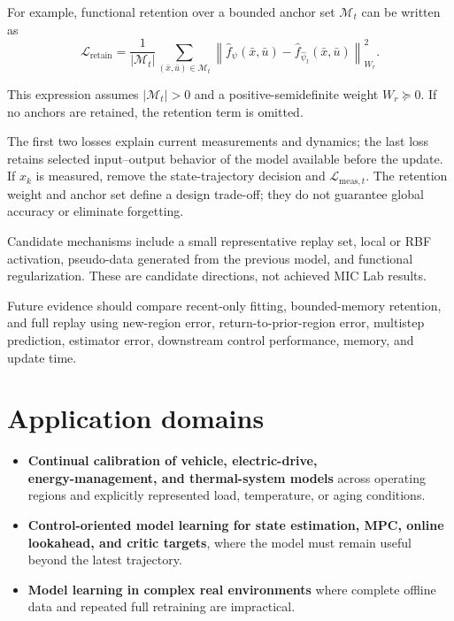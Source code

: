 \documentclass[a4paper]{article}
\begin{document}
For example, functional retention over a bounded anchor set
$\mathcal M_t$ can be written as
\begin{equation}
  \mathcal L_{\mathrm{retain}}
  =
  \frac{1}{|\mathcal M_t|}
  \sum_{(\bar x,\bar u)\in\mathcal M_t}
  \left\|
  \widehat f_{\psi}(\bar x,\bar u)
  -
  \widehat f_{\widehat\psi_t}(\bar x,\bar u)
  \right\|_{W_r}^{2}.
\end{equation}

This expression assumes $|\mathcal M_t|>0$ and a positive-semidefinite weight
$W_r\succeq0$. If no anchors are retained, the retention term is omitted.

The first two losses explain current measurements and dynamics; the last loss
retains selected input--output behavior of the model available before the
update. If $x_k$ is measured, remove the state-trajectory decision and
$\mathcal L_{\mathrm{meas},t}$. The retention weight and anchor set define a
design trade-off; they do not guarantee global accuracy or eliminate
forgetting.

Candidate mechanisms include a small representative replay set, local or RBF
activation, pseudo-data generated from the previous model, and functional
regularization. These are candidate directions, not achieved MIC Lab results.

Future evidence should compare recent-only fitting, bounded-memory retention,
and full replay using new-region error, return-to-prior-region error,
multistep prediction, estimator error, downstream control performance, memory,
and update time.

\section{Application domains}

\begin{itemize}
  \item \textbf{Continual calibration of vehicle, electric-drive,}\\
  \textbf{energy-management, and thermal-system models} across operating
  regions and explicitly represented load, temperature, or aging conditions.
  \item \textbf{Control-oriented model learning for state estimation, MPC,
  online lookahead, and critic targets}, where the model must remain useful
  beyond the latest trajectory.
  \item \textbf{Model learning in complex real environments} where complete
  offline data and repeated full retraining are impractical.
\end{itemize}
\end{document}

